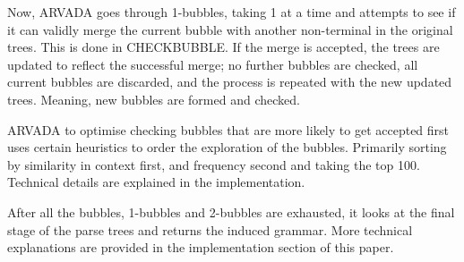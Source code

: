 Now, ARVADA goes through 1-bubbles, taking 1 at a time and attempts to see if it can validly merge the current bubble with another non-terminal in the original trees. This is done in CHECKBUBBLE. If the merge is accepted, the trees are updated to reflect the successful merge; no further bubbles are checked, all current bubbles are discarded, and the process is repeated with the new updated trees. Meaning, new bubbles are formed and checked. 

\vspace{\baselineskip}
ARVADA to optimise checking bubbles that are more likely to get accepted first uses certain heuristics to order the exploration of the bubbles. Primarily sorting by similarity in context first, and frequency second and taking the top 100. Technical details are explained in the implementation.

\vspace{\baselineskip}
After all the bubbles, 1-bubbles and 2-bubbles are exhausted, it looks at the final stage of the parse trees and returns the induced grammar. More technical explanations are provided in the implementation section of this paper.

